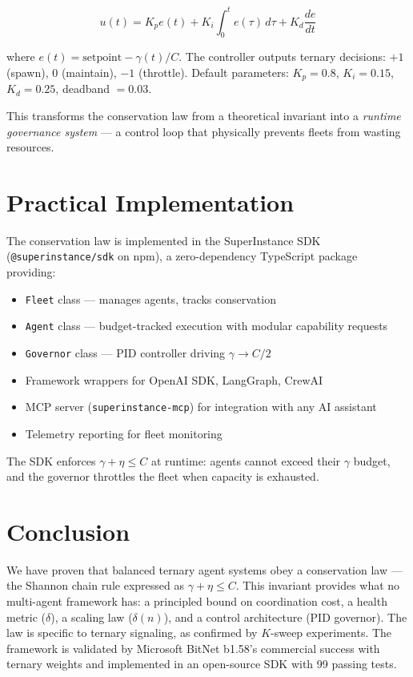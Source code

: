 \documentclass[11pt,a4paper]{article}
\newcommand{\C}{C}
\newcommand{\gammaCoord}{\gamma}
\newcommand{\etaVal}{\eta}
\begin{document}
\begin{equation}
u(t) = K_p e(t) + K_i \int_0^t e(\tau)\,d\tau + K_d \frac{de}{dt}
\end{equation}

where $e(t) = \text{setpoint} - \gammaCoord(t)/\C$. The controller outputs ternary decisions: $+1$ (spawn), $0$ (maintain), $-1$ (throttle). Default parameters: $K_p = 0.8$, $K_i = 0.15$, $K_d = 0.25$, deadband $= 0.03$.

This transforms the conservation law from a theoretical invariant into a \emph{runtime governance system} --- a control loop that physically prevents fleets from wasting resources.

\section{Practical Implementation}

The conservation law is implemented in the SuperInstance SDK (\texttt{@superinstance/sdk} on npm), a zero-dependency TypeScript package providing:

\begin{itemize}
\item \texttt{Fleet} class --- manages agents, tracks conservation
\item \texttt{Agent} class --- budget-tracked execution with modular capability requests
\item \texttt{Governor} class --- PID controller driving $\gammaCoord \to \C/2$
\item Framework wrappers for OpenAI SDK, LangGraph, CrewAI
\item MCP server (\texttt{superinstance-mcp}) for integration with any AI assistant
\item Telemetry reporting for fleet monitoring
\end{itemize}

The SDK enforces $\gammaCoord + \etaVal \leq \C$ at runtime: agents cannot exceed their $\gammaCoord$ budget, and the governor throttles the fleet when capacity is exhausted.

\section{Conclusion}

We have proven that balanced ternary agent systems obey a conservation law --- the Shannon chain rule expressed as $\gammaCoord + \etaVal \leq \C$. This invariant provides what no multi-agent framework has: a principled bound on coordination cost, a health metric ($\delta$), a scaling law ($\delta(n)$), and a control architecture (PID governor). The law is specific to ternary signaling, as confirmed by $K$-sweep experiments. The framework is validated by Microsoft BitNet b1.58's commercial success with ternary weights and implemented in an open-source SDK with 99 passing tests.
\end{document}
